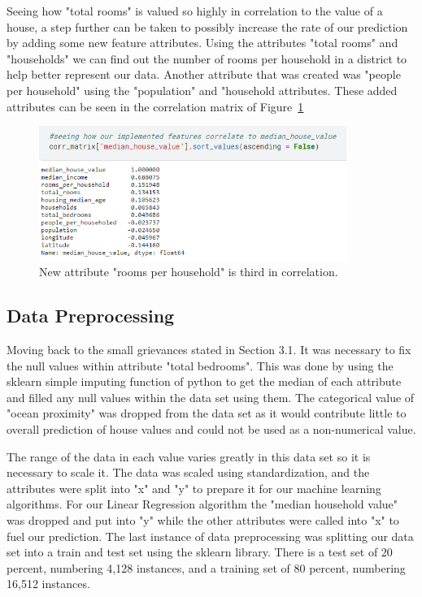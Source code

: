 \documentclass{article}
\begin{document}
Seeing how "total rooms" is valued so highly in correlation to the value of a house, a step further can be taken to possibly increase the rate of our prediction by adding some new feature attributes. Using the attributes "total rooms" and "households" we can find out the number of rooms per household in a district to help better represent our data. Another attribute that was created was "people per household" using the "population" and "household attributes. These added attributes can be seen in the correlation matrix of Figure~\ref{fig:new_correlation}

\begin{figure}[H]
\includegraphics[width=10.0cm]{Images/new_correlation.png}
\caption{\label{fig:new_correlation}New attribute "rooms per household" is third in correlation.}
\end{figure}

\subsection{Data Preprocessing}

Moving back to the small grievances stated in Section 3.1. It was necessary to fix the null values within attribute "total bedrooms". This was done by using the sklearn simple imputing function of python to get the median of each attribute and filled any null values within the data set using them. The categorical value of "ocean proximity" was dropped from the data set as it would contribute little to overall prediction of house values and could not be used as a non-numerical value.

The range of the data in each value varies greatly in this data set so it is necessary to scale it. The data was scaled using standardization, and the attributes were split into "x" and "y" to prepare it for our machine learning algorithms. For our Linear Regression algorithm the "median household value" was dropped and put into "y" while the other attributes were called into "x" to fuel our prediction. The last instance of data preprocessing was splitting our data set into a train and test set using the sklearn library. There is a test set of 20 percent, numbering 4,128 instances, and a training set of 80 percent, numbering 16,512 instances.
\end{document}
